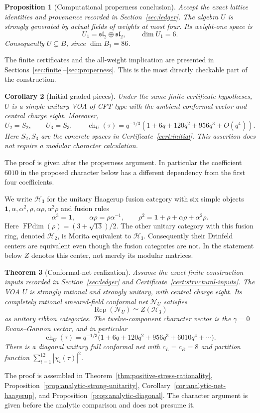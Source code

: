 \documentclass[11pt,a4paper]{article}
\newtheorem{theorem}{Theorem}[section]
\newtheorem{proposition}[theorem]{Proposition}
\newtheorem{corollary}[theorem]{Corollary}
\theoremstyle{definition}
\DeclareMathOperator{\Rep}{Rep}
\DeclareMathOperator{\ch}{ch}
\newcommand{\HH}{\mathcal H}
\newcommand{\one}{\mathbf1}
\begin{document}
\begin{proposition}[Computational properness conclusion]\label{prop:mainproper}
Accept the exact lattice identities and provenance recorded in
Section~\ref{sec:ledger}. The algebra \(U\) is strongly generated by
actual fields of weights at most four. Its weight-one space is
\[
 U_1=\mathfrak{sl}_2\oplus\mathfrak{sl}_2,\qquad \dim U_1=6.
\]
Consequently \(U\subsetneq B\), since \(\dim B_1=86\).
\end{proposition}
The finite certificates and the all-weight implication are presented in
Sections~\ref{sec:finite}--\ref{sec:properness}. This is the most directly
checkable part of the construction.

\begin{corollary}[Initial graded pieces]\label{cor:initial-grades}
Under the same finite-certificate hypotheses, $U$ is a simple unitary
VOA of CFT type with the ambient conformal vector and central charge
eight. Moreover,
\[
 U_2=S_2,\qquad U_3=S_3,\qquad
 \ch_U(\tau)=q^{-1/3}(1+6q+120q^2+956q^3+O(q^4)).
\]
Here $S_2,S_3$ are the concrete spaces in
Certificate~\ref{cert:initial}. This assertion does not require a modular
character calculation.
\end{corollary}
The proof is given after the properness argument. In particular the
coefficient $6010$ in the proposed character below has a different
dependency from the first four coefficients.

We write $\HH_3$ for the unitary Haagerup fusion category with six
simple objects $\one,\alpha,\alpha^2,\rho,\alpha\rho,\alpha^2\rho$
and fusion rules
\[
 \alpha^3=\one,\qquad \alpha\rho=\rho\alpha^{-1},\qquad
 \rho^2=\one+\rho+\alpha\rho+\alpha^2\rho.
\]
Here $\operatorname{FPdim}(\rho)=(3+\sqrt{13})/2$.
The other unitary category with this fusion ring, denoted $\HH_2$,
is Morita equivalent to $\HH_3$. Consequently their Drinfeld centers
are equivalent even though the fusion categories are not. In the
statement below $Z$ denotes this center, not merely its modular matrices.

\begin{theorem}[Conformal-net realization]\label{thm:main-net}
Assume the exact finite construction inputs recorded in
Section~\ref{sec:ledger} and Certificate~\ref{cert:structural-inputs}.
The VOA $U$ is strongly rational and strongly unitary, with central
charge eight. Its completely rational smeared-field conformal net
$\mathcal N_U$ satisfies
\[
 \Rep(\mathcal N_U)\simeq Z(\HH_3)
\]
as unitary ribbon categories. The twelve-component character vector
is the $\gamma=0$ Evans--Gannon vector, and in particular
\begin{equation}
 \ch_U(\tau)=q^{-1/3}\bigl(1+6q+120q^2+956q^3+6010q^4+\cdots\bigr).
 \label{eq:vacchar}
\end{equation}
There is a diagonal unitary full conformal net with $c_L=c_R=8$
and partition function $\sum_{i=1}^{12}|\chi_i(\tau)|^2$.
\end{theorem}
The proof is assembled in Theorem~\ref{thm:positive-stress-rationality},
Proposition~\ref{prop:analytic-strong-unitarity},
Corollary~\ref{cor:analytic-net-haagerup}, and
Proposition~\ref{prop:analytic-diagonal}. The character argument is
given before the analytic comparison and does not presume it.
\end{document}
